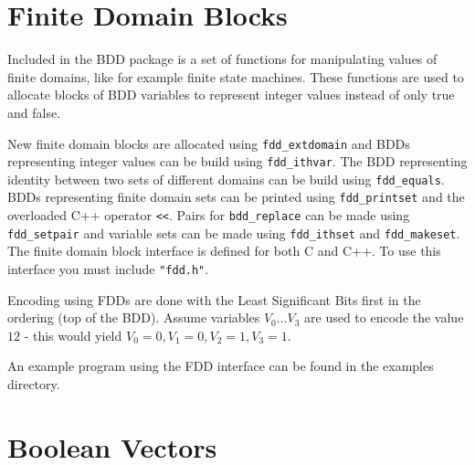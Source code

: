 \documentclass[a4paper,11pt,twoside,fleqn,openright]{report}
\begin{document}
\section{Finite Domain Blocks} 

Included in the BDD package is a set of functions for manipulating
values of finite domains, like for example finite state machines.
These functions are used to allocate blocks of BDD variables to
represent integer values instead of only true and false.

New finite domain blocks are allocated using {\tt fdd\_extdomain} and
BDDs representing integer values can be build using {\tt fdd\_ithvar}.
The BDD representing identity between two sets of different domains
can be build using {\tt fdd\_equals}. BDDs representing finite domain
sets can be printed using {\tt fdd\_printset} and the overloaded C++
operator {\tt <<}. Pairs for {\tt bdd\_replace} can be made using {\tt
  fdd\_setpair} and variable sets can be made using {\tt fdd\_ithset}
and {\tt fdd\_makeset}. The finite domain block interface is defined
for both C and C++. To use this interface you must include {\tt "fdd.h"}.

Encoding using FDDs are done with the Least Significant Bits first in
the ordering (top of the BDD). Assume variables $V_0 \ldots V_3$ are
used to encode the value $12$ - this would yield $V_0=0 , V_1=0 ,
V_2=1 , V_3=1$.

An example program using the FDD interface can be found in the
examples directory.


\section{Boolean Vectors} 
\end{document}
